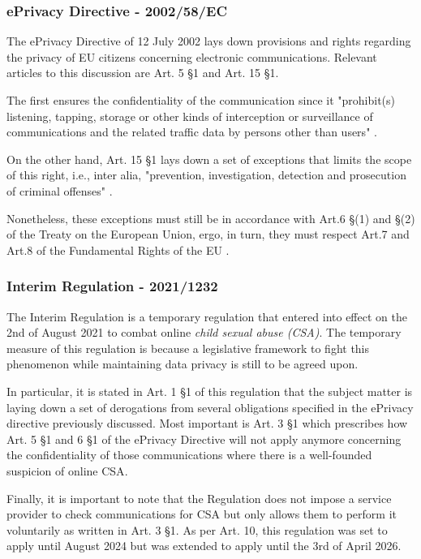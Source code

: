 \subsubsection{ePrivacy Directive - 2002/58/EC}
\label{sss:ePrivacy}

The ePrivacy Directive of 12 July 2002 lays down provisions and rights regarding the privacy of EU citizens concerning electronic communications. Relevant articles to this discussion are Art. 5 \S 1 and Art. 15 \S 1.

The first ensures the confidentiality of the communication since it "prohibit(s) listening, tapping, storage or other kinds of interception or surveillance of communications and the related traffic data by persons other than users" \cite{ePrivacy}. 

On the other hand, Art. 15 \S 1 lays down a set of exceptions that limits the scope of this right, i.e., inter alia, "prevention, investigation, detection and prosecution of criminal offenses" \cite{ePrivacy}. 

Nonetheless, these exceptions must still be in accordance with Art.6 \S(1) and \S(2) of the Treaty on the European Union, ergo, in turn, they must respect Art.7 and Art.8 of the Fundamental Rights of the EU \cite{ePrivacy} \cite{eu_charter_fundamental_rights} \cite{teu}.

\subsubsection{Interim Regulation - 2021/1232}

The Interim Regulation is a temporary regulation that entered into effect on the 2nd of August 2021 to combat online \textit{child sexual abuse (CSA)}. The temporary measure of this regulation is because a legislative framework to fight this phenomenon while maintaining data privacy is still to be agreed upon.

In particular, it is stated in Art. 1 \S 1 of this regulation that the subject matter is laying down a set of derogations from several obligations specified in the ePrivacy directive previously discussed\cite{interim_regualtion}. Most important is Art. 3 \S 1 which prescribes how Art. 5 \S 1 and 6 \S 1 of the ePrivacy Directive will not apply anymore concerning the confidentiality of those communications where there is a well-founded suspicion of online CSA\cite{interim_regualtion}.

Finally, it is important to note that the Regulation does not impose a service provider to check communications for CSA but only allows them to perform it voluntarily as written in Art. 3 \S 1\cite{interim_regualtion}. As per Art. 10, this regulation was set to apply until August 2024 but was extended to apply until the 3rd of April 2026\cite{interim_regualtion}.


